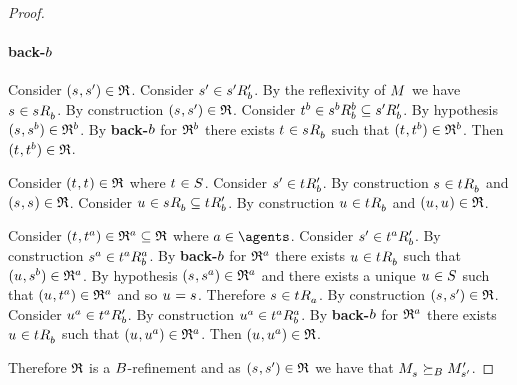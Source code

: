 \begin{proof}
\paragraph{back-$\agentB$}
Consider $(\kStateS, \kStateSP) \in \refinement$.
Consider $\kStateSP \in \kSuccessorsPB{\kStateSP}$.
By the reflexivity of $\kModel$ we have $\kStateS \in \kSuccessorsB{\kStateS}$.
By construction $(\kStateS, \kStateSP) \in \refinement$.
Consider $\kStateT[\agentB] \in \kSuccessorsB[\agentB]{\kStateS[\agentB]} \subseteq \kSuccessorsPB{\kStateSP}$.
By hypothesis $(\kStateS, \kStateS[\agentB]) \in \refinement^\agentB$.
By {\bf back-$\agentB$} for $\refinement^\agentB$ there exists $\kStateT \in \kSuccessorsB{\kStateS}$ such that $(\kStateT, \kStateT[\agentB]) \in \refinement^\agentB$.
Then $(\kStateT, \kStateT[\agentB]) \in \refinement$.

Consider $(\kStateT, \kStateT) \in \refinement$ where $\kStateT \in \kStates$.
Consider $\kStateSP \in \kSuccessorsPB{\kStateT}$.
By construction $\kStateS \in \kSuccessorsB{\kStateT}$ and $(\kStateS, \kStateS) \in \refinement$.
Consider $\kStateU \in \kSuccessorsB{\kStateS} \subseteq \kSuccessorsPB{\kStateT}$.
By construction $\kStateU \in \kSuccessorsB{\kStateT}$ and $(\kStateU, \kStateU) \in \refinement$.

Consider $(\kStateT, \kStateT[\agentA]) \in \refinement^\agentA \subseteq \refinement$ where $\agentA \in \agents$.
Consider $\kStateSP \in \kSuccessorsPB{\kStateT[\agentA]}$.
By construction $\kStateS[\agentA] \in \kSuccessorsB[\agentA]{\kStateT[\agentA]}$.
By {\bf back-$\agentB$} for $\refinement^\agentA$ there exists $\kStateU \in \kSuccessorsB{\kStateT}$ such that $(\kStateU, \kStateS[\agentB]) \in \refinement^\agentA$.
By hypothesis $(\kStateS, \kStateS[\agentA]) \in \refinement^\agentA$ and there exists a unique $\kStateU \in \kStates$ such that $(\kStateU, \kStateT[\agentA]) \in \refinement^\agentA$ and so $\kStateU = \kStateS$.
Therefore $\kStateS \in \kSuccessorsA{\kStateT}$.
By construction $(\kStateS, \kStateSP) \in \refinement$.
Consider $\kStateU[\agentA] \in \kSuccessorsPB{\kStateT[\agentA]}$.
By construction $\kStateU[\agentA] \in \kSuccessorsB[\agentA]{\kStateT[\agentA]}$.
By {\bf back-$\agentB$} for $\refinement^\agentA$ there exists $\kStateU \in \kSuccessorsB{\kStateT}$ such that $(\kStateU, \kStateU[\agentA]) \in \refinement^\agentA$.
Then $(\kStateU, \kStateU[\agentA]) \in \refinement$.

Therefore $\refinement$ is a $\agentsB$-refinement and as $(\kStateS, \kStateSP) \in \refinement$ we have that $\kPModel{\kStateS} \simulatesBs \kPModelP{\kStateSP}$.


\end{proof}
